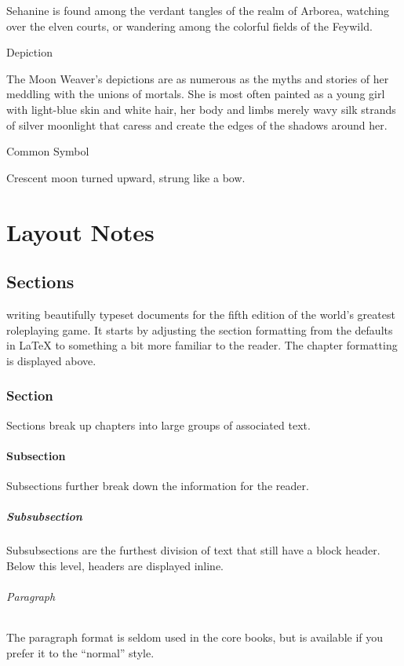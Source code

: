 \documentclass[letterpaper,twocolumn,openany,nodeprecatedcode]{dndbook}
\begin{document}
Sehanine is found among the verdant tangles of the realm of Arborea, watching over the elven
courts, or wandering among the colorful fields of the Feywild.

\subparagraph{Depiction}
The Moon Weaver’s depictions are as numerous as the myths and stories of her meddling with
the unions of mortals. She is most often painted as a young girl with light-blue skin and
white hair, her body and limbs merely wavy silk strands of silver moonlight that caress and
create the edges of the shadows around her.

\subparagraph{Common Symbol}
Crescent moon turned upward, strung like a bow.

\part{Layout Notes}

\chapter{Sections}

 writing beautifully typeset documents for the fifth edition of the world's greatest roleplaying game. It starts by adjusting the section formatting from the defaults in \LaTeX{} to something a bit more familiar to the reader. The chapter formatting is displayed above.

\section{Section}
Sections break up chapters into large groups of associated text.

\subsection{Subsection}
Subsections further break down the information for the reader.

\subsubsection{Subsubsection}
Subsubsections are the furthest division of text that still have a block header. Below this level, headers are displayed inline.

\paragraph{Paragraph}
The paragraph format is seldom used in the core books, but is available if you prefer it to the ``normal'' style.
\end{document}
